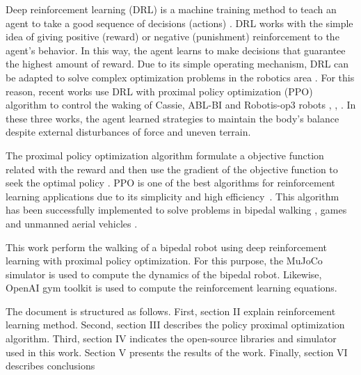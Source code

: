 Deep reinforcement learning (DRL) is a machine training method to teach an agent to take a good sequence of decisions (actions) \cite{sutton2018reinforcement}. DRL works with the simple idea of giving positive (reward) or negative (punishment) reinforcement to the agent's behavior. In this way, the agent learns to make decisions that guarantee the highest amount of reward. Due to its simple operating mechanism, DRL can be adapted to solve complex optimization problems in the robotics area \cite{kober2013reinforcement}. For this reason, recent works use DRL with proximal policy optimization (PPO) algorithm to control the waking of Cassie, ABL-BI and Robotis-op3 robots \cite{xie2018feedback}, \cite{beranek2021behavior}, \cite{jiang2020motion}. In these three works, the agent learned strategies to maintain the body's balance despite external disturbances of force and uneven terrain. 


The proximal policy optimization algorithm formulate a objective function related with the reward and then use the gradient of the objective function to seek the optimal policy \cite{schulman2017proximal}. PPO is one of the best algorithms for reinforcement learning applications due to its simplicity and high efficiency~\cite{schulman2017proximal}. This algorithm has been successfully implemented to solve problems in bipedal walking \cite{melo2019learning}, games \cite{kristensen2020strategies} and unmanned aerial vehicles \cite{bohn2019deep}.


This work perform the walking of a bipedal robot using deep reinforcement learning with proximal policy optimization. For this purpose, the MuJoCo simulator is used to compute the dynamics of the bipedal robot. Likewise, OpenAI gym toolkit is used to compute the reinforcement learning equations.

The document is structured as follows. First, section II explain reinforcement learning method. Second, section III describes the policy proximal optimization algorithm. Third, section IV indicates the open-source libraries and simulator used in this work. Section V presents the results of the work. Finally, section VI describes conclusions 


